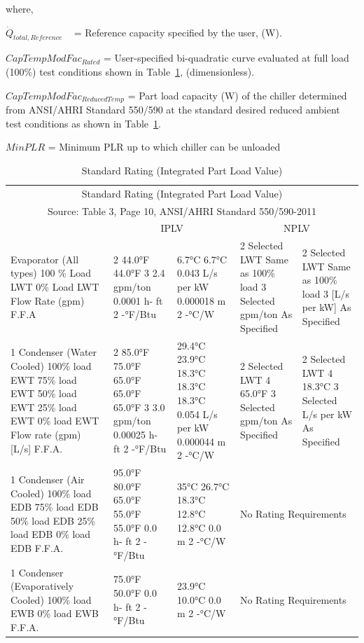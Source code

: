 where,

\({\dot Q_{total,Reference}}\) ~ = Reference capacity specified by the user, (W).

\(CapTempModFa{c_{Rated}}\) = User-specified bi-quadratic curve evaluated at full load (100\%) test conditions shown in Table~\ref{table:standard-rating-integrated-part-load-value}, (dimensionless).

\(CapTempModFa{c_{ReducedTemp}}\) = Part load capacity (W) of the chiller determined from ANSI/AHRI Standard 550/590 at the standard desired reduced ambient test conditions as shown in Table~\ref{table:standard-rating-integrated-part-load-value}.

\(MinPLR\) = Minimum PLR up to which chiller can be unloaded

\begin{longtable}[c]{p{1.2in}p{1.2in}p{1.2in}p{1.2in}p{1.2in}}
\caption{Standard Rating (Integrated Part Load Value) \protect \label{table:standard-rating-integrated-part-load-value}}\\
\toprule 
\multicolumn{5}{c}{Standard Rating (Integrated Part Load Value)} \tabularnewline
\multicolumn{5}{c}{Source: Table 3, Page 10, ANSI/AHRI Standard 550/590-2011} \tabularnewline \midrule
\endhead
 & \multicolumn{2}{c}{IPLV} & \multicolumn{2}{c}{NPLV} \tabularnewline
Evaporator (All types)  100 \% Load LWT  0\% Load LWT  Flow Rate (gpm)  F.F.A & 2 44.0°F  44.0°F  3 2.4 gpm/ton  0.0001  h- ft 2 -°F/Btu & 6.7°C  6.7°C  0.043 L/s per  kW  0.000018  m 2 -°C/W & 2 Selected LWT  Same as 100\%  load  3 Selected  gpm/ton  As Specified & 2 Selected  LWT  Same as 100\%  load  3 [L/s per kW]  As Specified \tabularnewline
1 Condenser (Water  Cooled)  100\% load EWT  75\% load EWT  50\% load EWT  25\% load EWT  0\% load EWT  Flow rate (gpm) [L/s]  F.F.A. & 2 85.0°F  75.0°F  65.0°F  65.0°F  65.0°F  3 3.0 gpm/ton  0.00025  h- ft 2 -°F/Btu & 29.4°C  23.9°C  18.3°C  18.3°C  18.3°C  0.054 L/s per  kW  0.000044  m 2 -°C/W & 2 Selected LWT  4 65.0°F  3 Selected  gpm/ton  As Specified & 2 Selected LWT  4 18.3°C  3 Selected  L/s per kW  As Specified \tabularnewline
1 Condenser (Air Cooled)  100\% load EDB  75\% load EDB  50\% load EDB  25\% load EDB  0\% load EDB  F.F.A. & 95.0°F  80.0°F  65.0°F  55.0°F  55.0°F  0.0 h- ft 2  -°F/Btu & 35°C  26.7°C  18.3°C  12.8°C  12.8°C  0.0 m 2 -°C/W & \multicolumn{2}{l}{No Rating Requirements} \tabularnewline
1 Condenser  (Evaporatively Cooled)  100\% load EWB  0\% load EWB  F.F.A. & 75.0°F  50.0°F  0.0 h- ft 2  -°F/Btu & 23.9°C  10.0°C  0.0 m 2 -°C/W & \multicolumn{2}{l}{No Rating Requirements} \tabularnewline

\end{longtable}
